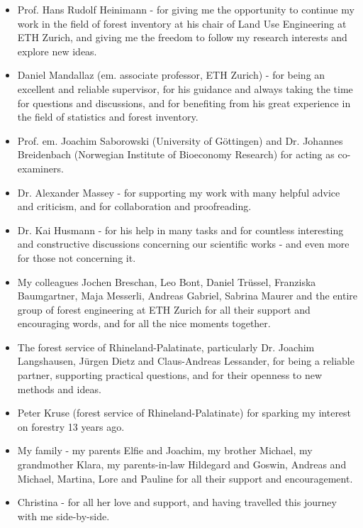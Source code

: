 \renewcommand{\labelitemi}{--}
\begin{itemize}
	\item Prof. Hans Rudolf Heinimann - for giving me the opportunity to continue my work in the field of forest inventory at his chair of Land Use Engineering at ETH Zurich, and giving me the freedom to follow my research interests and explore new ideas.
	
	\item Daniel Mandallaz (em. associate professor, ETH Zurich) - for being an excellent and reliable supervisor, for his guidance and always taking the time for questions and discussions, and for benefiting from his great experience in the field of statistics and forest inventory.
	
	\item Prof. em. Joachim Saborowski (University of G{\"o}ttingen) and Dr. Johannes Breidenbach (Norwegian Institute of Bioeconomy Research) for acting as co-examiners.
	
	\item Dr. Alexander Massey - for supporting my work with many helpful advice and criticism, and for collaboration and proofreading.
	
	\item Dr. Kai Husmann - for his help in many tasks and for countless interesting and constructive discussions concerning our scientific works - and even more for those not concerning it.
	
	\item My colleagues Jochen Breschan, Leo Bont, Daniel Tr{\"u}ssel, Franziska Baumgartner, Maja Messerli, Andreas Gabriel, Sabrina Maurer and the entire group of forest engineering at ETH Zurich for all their support and encouraging words, and for all the nice moments together.
	
	\item The forest service of Rhineland-Palatinate, particularly Dr. Joachim Langshausen, J{\"u}rgen Dietz and Claus-Andreas Lessander, for being a reliable partner, supporting practical questions, and for their openness to new methods and ideas.
	
	\item Peter Kruse (forest service of Rhineland-Palatinate) for sparking my interest on forestry 13 years ago.
	
	\item My family - my parents Elfie and Joachim, my brother Michael, my grandmother Klara, my parents-in-law Hildegard and Goswin, Andreas and Michael, Martina, Lore and Pauline for all their support and encouragement.
	
	\item Christina - for all her love and support, and having travelled this journey with me side-by-side.
	
\end{itemize}


\newpage
